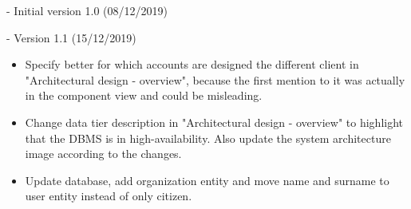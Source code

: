 - Initial version 1.0 (08/12/2019)

- Version 1.1 (15/12/2019)
\begin{itemize}
	\item Specify better for which accounts are designed the different client in "Architectural design - overview", because the first mention to it was actually in the component view and could be misleading.
	\item Change data tier description in "Architectural design - overview" to highlight that the DBMS is in high-availability. Also update the system architecture image according to the changes.
	\item Update database, add organization entity and move name and surname to user entity instead of only citizen.
\end{itemize}